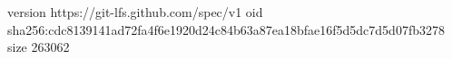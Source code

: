version https://git-lfs.github.com/spec/v1
oid sha256:cdc8139141ad72fa4f6e1920d24c84b63a87ea18bfae16f5d5dc7d5d07fb3278
size 263062
